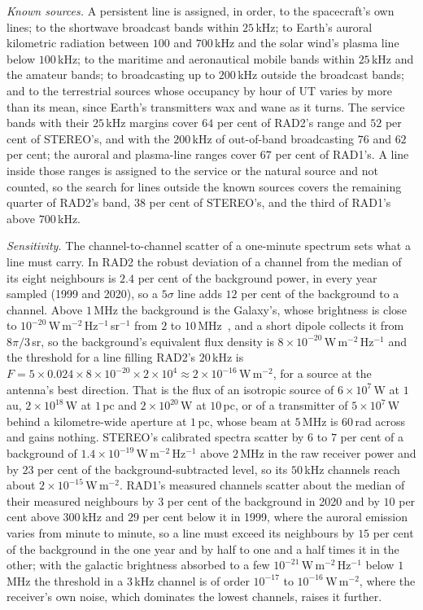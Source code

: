 \documentclass[3p,11pt]{elsarticle}
\begin{document}
\emph{Known sources.} A persistent line is assigned, in order, to the spacecraft's own
lines; to the shortwave broadcast bands within $25$\,kHz; to Earth's auroral kilometric
radiation between $100$ and $700$\,kHz and the solar wind's plasma line below
$100$\,kHz; to the maritime and aeronautical mobile bands within $25$\,kHz and the
amateur bands; to broadcasting up to $200$\,kHz outside the broadcast bands; and to the
terrestrial sources whose occupancy by hour of UT varies by more than its mean, since
Earth's transmitters wax and wane as it turns. The service bands with their $25$\,kHz
margins cover $64$ per cent of RAD2's range and $52$ per cent of STEREO's, and with the
$200$\,kHz of out-of-band broadcasting $76$ and $62$ per cent; the auroral and
plasma-line ranges cover $67$ per cent of RAD1's. A line inside those ranges is
assigned to the service or the natural source and not counted, so the search for lines
outside the known sources covers the remaining quarter of RAD2's band, $38$ per cent of
STEREO's, and the third of RAD1's above $700$\,kHz.

\emph{Sensitivity.} The channel-to-channel scatter of a one-minute spectrum sets what
a line must carry. In RAD2 the robust deviation of a channel from the median of its
eight neighbours is $2.4$ per cent of the background power, in every year sampled
(1999 and 2020), so a $5\sigma$ line adds $12$ per cent of the background to a channel.
Above $1$\,MHz the background is the Galaxy's, whose brightness is close to
$10^{-20}$\,W\,m$^{-2}$\,Hz$^{-1}$\,sr$^{-1}$ from $2$ to $10$\,MHz~\cite{Cane1979},
and a short dipole collects it from $8\pi/3$\,sr, so the background's equivalent flux
density is $8\times10^{-20}$\,W\,m$^{-2}$\,Hz$^{-1}$ and the threshold for a line
filling RAD2's $20$\,kHz is $F=5\times0.024\times8\times10^{-20}\times2\times10^{4}
\approx2\times10^{-16}$\,W\,m$^{-2}$, for a source at the antenna's best direction.
That is the flux of an isotropic source of $6\times10^{7}$\,W at $1$\,au,
$2\times10^{18}$\,W at $1$\,pc and $2\times10^{20}$\,W at $10$\,pc, or of a transmitter
of $5\times10^{7}$\,W behind a kilometre-wide aperture at $1$\,pc, whose beam at
$5$\,MHz is $60$\,rad across and gains nothing. STEREO's calibrated spectra scatter by
$6$ to $7$ per cent of a background of $1.4\times10^{-19}$\,W\,m$^{-2}$\,Hz$^{-1}$
above $2$\,MHz in the raw receiver power and by $23$ per cent of the
background-subtracted level, so its $50$\,kHz channels reach about
$2\times10^{-15}$\,W\,m$^{-2}$. RAD1's measured channels scatter about the median of
their measured neighbours by $3$ per cent of the background in 2020 and by $10$ per
cent above $300$\,kHz and $29$ per cent below it in 1999, where the auroral emission
varies from minute to minute, so a line must exceed its neighbours by $15$ per cent of
the background in the one year and by half to one and a half times it in the other;
with the galactic brightness absorbed to a few
$10^{-21}$\,W\,m$^{-2}$\,Hz$^{-1}$ below $1$\,MHz the threshold in a $3$\,kHz channel
is of order $10^{-17}$ to $10^{-16}$\,W\,m$^{-2}$, where the receiver's own noise,
which dominates the lowest channels, raises it further.
\end{document}
